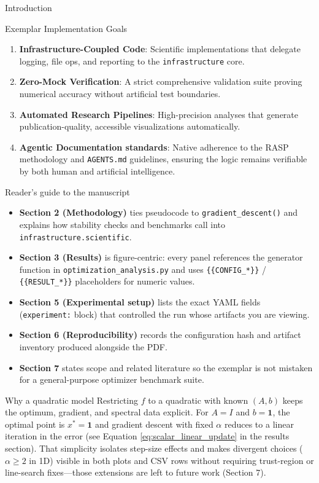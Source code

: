 \documentclass[
  ignorenonframetext,
]{beamer}
\providecommand{\tightlist}{%
  \setlength{\itemsep}{0pt}\setlength{\parskip}{0pt}}
\begin{document}
\begin{frame}[fragile]{Introduction}
\begin{block}{Exemplar Implementation Goals}
\begin{enumerate}
\tightlist
\item
  \textbf{Infrastructure-Coupled Code}: Scientific implementations that
  delegate logging, file ops, and reporting to the
  \texttt{infrastructure} core.
\item
  \textbf{Zero-Mock Verification}: A strict comprehensive validation
  suite proving numerical accuracy without artificial test boundaries.
\item
  \textbf{Automated Research Pipelines}: High-precision analyses that
  generate publication-quality, accessible visualizations automatically.
\item
  \textbf{Agentic Documentation standards}: Native adherence to the RASP
  methodology and \texttt{AGENTS.md} guidelines, ensuring the logic
  remains verifiable by both human and artificial intelligence.
\end{enumerate}
\end{block}

\begin{block}{Reader's guide to the manuscript}
\protect{}\label{readers-guide-to-the-manuscript}
\begin{itemize}
\tightlist
\item
  \textbf{Section 2 (Methodology)} ties pseudocode to
  \texttt{gradient\_descent()} and explains how stability checks and
  benchmarks call into \texttt{infrastructure.scientific}.
\item
  \textbf{Section 3 (Results)} is figure-centric: every panel references
  the generator function in \texttt{optimization\_analysis.py} and uses
  \texttt{\{\{CONFIG\_*\}\}} / \texttt{\{\{RESULT\_*\}\}} placeholders
  for numeric values.
\item
  \textbf{Section 5 (Experimental setup)} lists the exact YAML fields
  (\texttt{experiment:} block) that controlled the run whose artifacts
  you are viewing.
\item
  \textbf{Section 6 (Reproducibility)} records the configuration hash
  and artifact inventory produced alongside the PDF.
\item
  \textbf{Section 7} states scope and related literature so the exemplar
  is not mistaken for a general-purpose optimizer benchmark suite.
\end{itemize}
\end{block}

\begin{block}{Why a quadratic model}
\protect{}\label{why-a-quadratic-model}
Restricting \(f\) to a quadratic with known \((A,b)\) keeps the optimum,
gradient, and spectral data explicit. For \(A = I\) and
\(b = \mathbf{1}\), the optimal point is \(x^\ast = \mathbf{1}\) and
gradient descent with fixed \(\alpha\) reduces to a linear iteration in
the error (see Equation \ref{eq:scalar_linear_update} in the results
section). That simplicity isolates step-size effects and makes divergent
choices (\(\alpha \geq 2\) in 1D) visible in both plots and CSV rows
without requiring trust-region or line-search fixes---those extensions
are left to future work (Section 7).
\end{block}
\end{frame}
\end{document}
